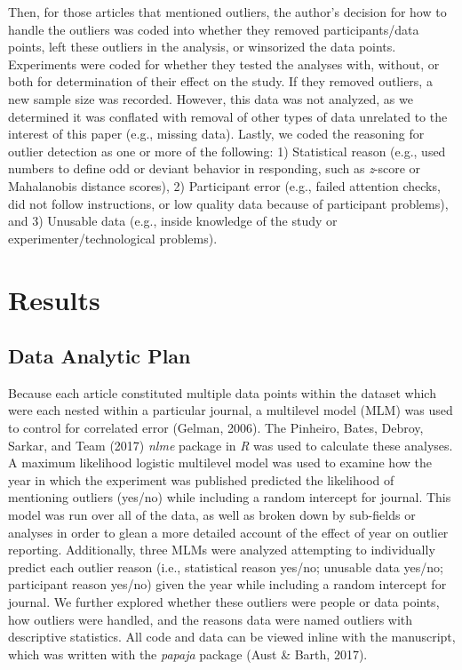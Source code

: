 \documentclass[english,man]{apa6}
\theoremstyle{definition}
\theoremstyle{definition}
\theoremstyle{definition}
\theoremstyle{remark}
\begin{document}
Then, for those articles that mentioned outliers, the author's decision
for how to handle the outliers was coded into whether they removed
participants/data points, left these outliers in the analysis, or
winsorized the data points. Experiments were coded for whether they
tested the analyses with, without, or both for determination of their
effect on the study. If they removed outliers, a new sample size was
recorded. However, this data was not analyzed, as we determined it was
conflated with removal of other types of data unrelated to the interest
of this paper (e.g., missing data). Lastly, we coded the reasoning for
outlier detection as one or more of the following: 1) Statistical reason
(e.g., used numbers to define odd or deviant behavior in responding,
such as \emph{z}-score or Mahalanobis distance scores), 2) Participant
error (e.g., failed attention checks, did not follow instructions, or
low quality data because of participant problems), and 3) Unusable data
(e.g., inside knowledge of the study or experimenter/technological
problems).

\section{Results}\label{results}

\subsection{Data Analytic Plan}\label{data-analytic-plan}

Because each article constituted multiple data points within the dataset
which were each nested within a particular journal, a multilevel model
(MLM) was used to control for correlated error (Gelman, 2006). The
Pinheiro, Bates, Debroy, Sarkar, and Team (2017) \emph{nlme} package in
\emph{R} was used to calculate these analyses. A maximum likelihood
logistic multilevel model was used to examine how the year in which the
experiment was published predicted the likelihood of mentioning outliers
(yes/no) while including a random intercept for journal. This model was
run over all of the data, as well as broken down by sub-fields or
analyses in order to glean a more detailed account of the effect of year
on outlier reporting. Additionally, three MLMs were analyzed attempting
to individually predict each outlier reason (i.e., statistical reason
yes/no; unusable data yes/no; participant reason yes/no) given the year
while including a random intercept for journal. We further explored
whether these outliers were people or data points, how outliers were
handled, and the reasons data were named outliers with descriptive
statistics. All code and data can be viewed inline with the manuscript,
which was written with the \emph{papaja} package (Aust \& Barth, 2017).
\end{document}
